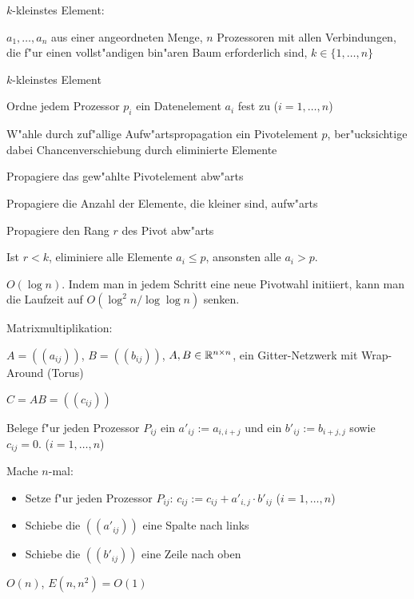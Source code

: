 \algorithm $k$-kleinstes Element:{
  \given $a_1,\ldots,a_n$ aus einer angeordneten Menge, $n$ Prozessoren
    mit allen Verbindungen, die f"ur einen vollst"andigen bin"aren Baum 
    erforderlich sind, $k\in\{1,\ldots,n\}$
    
  \aim $k$-kleinstes Element
  
  \begin{proc}
    \item Ordne jedem Prozessor $p_i$ ein Datenelement $a_i$ fest zu
      ($i=1,\ldots,n$)
    \item W"ahle durch zuf"allige Aufw"artspropagation ein Pivotelement $p$,
      ber"ucksichtige dabei Chancenverschiebung durch eliminierte Elemente
    \item Propagiere das gew"ahlte Pivotelement abw"arts
    \item Propagiere die Anzahl der Elemente, die kleiner sind, aufw"arts
    \item Propagiere den Rang $r$ des Pivot abw"arts
    \item Ist $r<k$, eliminiere alle Elemente $a_i\le p$, ansonsten alle $a_i>p$.
  \end{proc}
  
  \cpx $O(\log n)$. Indem man in jedem Schritt eine neue Pivotwahl initiiert,
    kann man die Laufzeit auf $O(\log^2 n/\log \log n)$ senken.
}
\algorithm Matrixmultiplikation:{
  \given $A=((a_{ij}))$, $B=((b_{ij}))$, $A,B\in\mathbb R^{n\times n}$, ein
    Gitter-Netzwerk mit Wrap-Around (Torus)
  
  \aim $C=AB=((c_{ij}))$
  
  \begin{proc}
    \item Belege f"ur jeden Prozessor $P_{ij}$ ein $a'_{ij}:=a_{i,i+j}$ und
      ein $b'_{ij}:=b_{i+j,j}$ sowie $c_{ij}=0$. ($i=1,\ldots,n$)
    \item Mache $n$-mal:
      \begin{itemize}
        \item Setze f"ur jeden Prozessor $P_{ij}$:
          $c_{ij}:=c_{ij}+a'_{i,j}\cdot b'_{ij}$ ($i=1,\ldots,n$)
        \item Schiebe die $((a'_{ij}))$ eine Spalte nach links
        \item Schiebe die $((b'_{ij}))$ eine Zeile nach oben
      \end{itemize}
  \end{proc}
  
  \cpx $O(n)$, $E(n,n^2)=O(1)$
}
